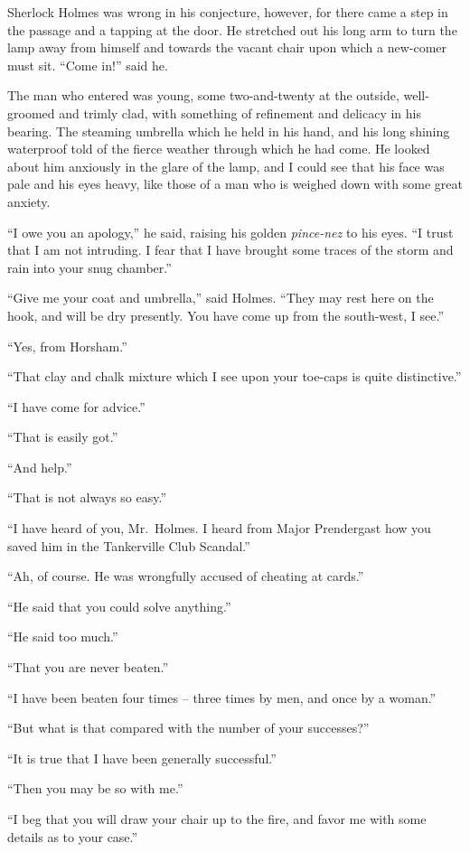 Sherlock Holmes was wrong in his conjecture, however, for
there came a step in the passage and a tapping at the door.
He stretched out his long arm to turn the lamp away from
himself and towards the vacant chair upon which a new-comer
must sit. “Come in!” said he.

The man who entered was young, some two-and-twenty at
the outside, well-groomed and trimly clad, with something of
refinement and delicacy in his bearing. The steaming umbrella
which he held in his hand, and his long shining waterproof
told of the fierce weather through which he had come.
He looked about him anxiously in the glare of the lamp, and
I could see that his face was pale and his eyes heavy, like
those of a man who is weighed down with some great anxiety.

“I owe you an apology,” he said, raising his golden \textit{pince-nez}
to his eyes. “I trust that I am not intruding. I fear
that I have brought some traces of the storm and rain into
your snug chamber.”

“Give me your coat and umbrella,” said Holmes. “They
may rest here on the hook, and will be dry presently. You
have come up from the south-west, I see.”

“Yes, from Horsham.”

“That clay and chalk mixture which I see upon your toe-caps
is quite distinctive.”

“I have come for advice.”

“That is easily got.”

“And help.”

“That is not always so easy.”

“I have heard of you, Mr.~Holmes. I heard from Major
Prendergast how you saved him in the Tankerville Club
Scandal.”

“Ah, of course. He was wrongfully accused of cheating at
cards.”

“He said that you could solve anything.”

“He said too much.”

“That you are never beaten.”

“I have been beaten four times -- three times by men, and
once by a woman.”

“But what is that compared with the number of your
successes?”

“It is true that I have been generally successful.”

“Then you may be so with me.”

“I beg that you will draw your chair up to the fire, and favor
me with some details as to your case.”

